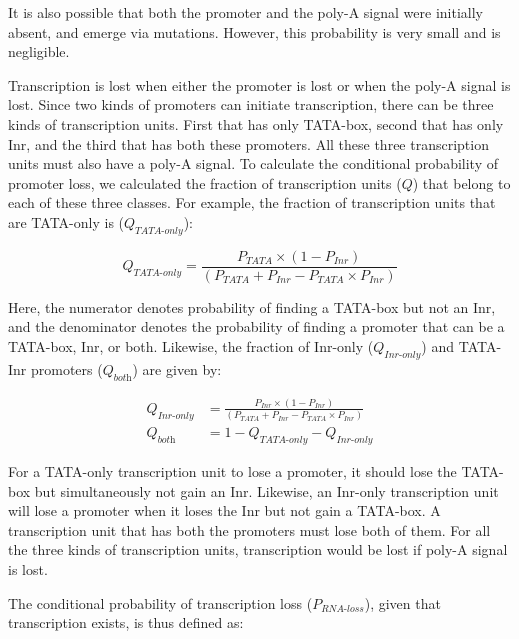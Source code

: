 \documentclass[12pt,a4paper]{article}
\begin{document}
It is also possible that both the promoter and the poly-A signal were initially absent, and emerge via mutations. However, this probability is very small and is negligible.

Transcription is lost when either the promoter is lost or when the poly-A signal is lost. Since two kinds of promoters can initiate transcription, there can be three kinds of transcription units. First that has only TATA-box, second that has only Inr, and the third that has both these promoters. All these three transcription units must also have a poly-A signal. To calculate the conditional probability of promoter loss, we calculated the fraction of transcription units ($Q$) that belong to each of these three classes. For example, the fraction of transcription units that are TATA-only is ($Q_\textit{TATA-only}$):

\begin{equation*}
Q_\textit{TATA-only} = \frac{P_\textit{TATA}\times(1 - P_\textit{Inr})}{(P_\textit{TATA} + P_\textit{Inr} - P_\textit{TATA}\times P_\textit{Inr})}
\end{equation*}

\vspace{1ex}

Here, the numerator denotes probability of finding a TATA-box but not an Inr, and the denominator denotes the probability of finding a promoter that can be a TATA-box, Inr, or both. Likewise, the fraction of Inr-only ($Q_\textit{Inr-only}$) and TATA-Inr promoters ($Q_\textit{both}$) are given by:

\begin{align*}
Q_\textit{Inr-only} & = \frac{P_\textit{Inr}\times(1 - P_\textit{Inr})}{(P_\textit{TATA} + P_\textit{Inr} - P_\textit{TATA}\times P_\textit{Inr})} \\[1ex]
Q_\textit{both} & = 1 - Q_\textit{TATA-only} -Q_\textit{Inr-only}
\end{align*}

For a TATA-only transcription unit to lose a promoter, it should lose the TATA-box but simultaneously not gain an Inr. Likewise, an Inr-only transcription unit will lose a promoter when it loses the Inr but not gain a TATA-box. A transcription unit that has both the promoters must lose both of them. For all the three kinds of transcription units, transcription would be lost if poly-A signal is lost.

The conditional probability of transcription loss ($P_\textit{RNA-loss}$), given that transcription exists, is thus defined as:
\end{document}
